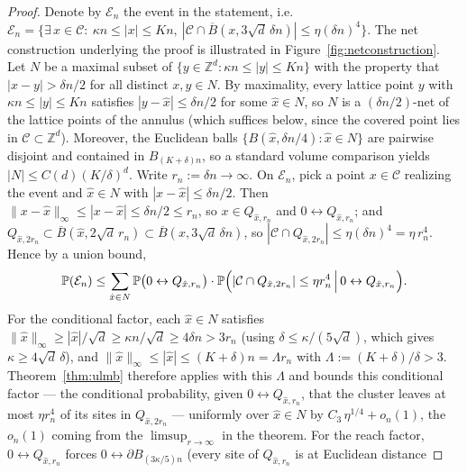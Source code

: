\documentclass[11pt]{article}
\theoremstyle{definition}
\theoremstyle{remark}
\newcommand{\Z}{\mathbb{Z}}
\newcommand{\bP}{\mathbb{P}}
\numberwithin{equation}{section}
\theoremstyle{plain}
\theoremstyle{definition}
\theoremstyle{remark}
\theoremstyle{plain}
\begin{document}
\begin{proof}
Denote by $\mathcal E_n$ the event in the statement, i.e.\
$\mathcal E_n=\{\exists\,x\in \mathcal C:\ \kappa n\le|x|\le Kn,\ |\mathcal C\cap
\overline B(x,3\sqrt d\,\delta n)|\le\eta(\delta n)^4\}$.
The net construction underlying the proof is illustrated in
Figure~\ref{fig:netconstruction}.
Let $N$ be a maximal subset of $\{y\in\Z^d:\kappa n\le|y|\le Kn\}$ with
the property that $|x-y|>\delta n/2$ for all distinct $x,y\in N$. By
maximality, every lattice point $y$ with $\kappa n\le|y|\le Kn$ satisfies
$|y-\hat x|\le\delta n/2$ for some $\hat x\in N$, so $N$ is a
$(\delta n/2)$-net of the lattice points of the annulus (which suffices below,
since the covered point lies in $\mathcal C\subset\Z^d$). Moreover, the Euclidean balls
$\{B(\hat x,\delta n/4):\hat x\in N\}$ are pairwise disjoint and contained in
$B_{(K+\delta)n}$, so a standard volume comparison yields
$|N|\le C(d)(K/\delta)^d$. Write
$r_n:=\delta n\to\infty$. On $\mathcal E_n$, pick a point $x\in \mathcal C$
realizing the event and $\hat x\in N$ with
$|x-\hat x|\le\delta n/2$. Then $\lVert x-\hat x\rVert_\infty\le|x-\hat x|\le\delta n/2\le r_n$,
so $x\in Q_{\hat x,r_n}$ and $0\leftrightarrow Q_{\hat x,r_n}$;
and $Q_{\hat x,2r_n}\subset \overline B(\hat x,2\sqrt d\,r_n)\subset
\overline B(x,3\sqrt d\,\delta n)$, so $|\mathcal C\cap Q_{\hat
x,2r_n}|\le\eta(\delta n)^4=\eta\,r_n^4$. Hence by a union
bound,
\begin{equation}\label{eq:nothinunion}
\bP(\mathcal E_n)\le\sum_{\hat x\in N}
\bP\bigl(0\leftrightarrow Q_{\hat x,r_n}\bigr)\cdot
\bP\Bigl(|\mathcal C\cap Q_{\hat x,2r_n}|\le\eta r_n^4
\,\Big|\,0\leftrightarrow Q_{\hat x,r_n}\Bigr).
\end{equation}
For the conditional factor, each $\hat x\in N$ satisfies
$\lVert\hat x\rVert_\infty\ge|\hat x|/\sqrt d\ge\kappa n/\sqrt d\ge
4\delta n>3r_n$ (using $\delta\le\kappa/(5\sqrt d)$, which gives
$\kappa\ge4\sqrt d\,\delta$), and
$\lVert\hat x\rVert_\infty\le|\hat x|\le(K+\delta)n=\Lambda r_n$ with
$\Lambda:=(K+\delta)/\delta>3$.
Theorem~\ref{thm:ulmb} therefore applies with this $\Lambda$ and bounds
this conditional factor --- the conditional probability, given $0\leftrightarrow Q_{\hat x,r_n}$,
that the cluster leaves at most $\eta r_n^4$ of its sites in $Q_{\hat x,2r_n}$
--- uniformly over $\hat x\in N$ by $C_3\,\eta^{1/4}+o_n(1)$, the $o_n(1)$ coming
from the $\limsup_{r\to\infty}$ in the theorem. For the reach factor, $0\leftrightarrow Q_{\hat x,r_n}$ forces $0\leftrightarrow\partial B_{(3\kappa/5)n}$
(every site of $Q_{\hat x,r_n}$ is at Euclidean distance

\end{proof}
\end{document}
